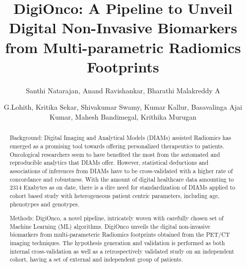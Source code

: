 \documentclass[final,1p,times,twocolumn]{elsarticle}
\begin{document}
\begin{frontmatter}



\title{DigiOnco: A Pipeline to Unveil Digital Non-Invasive Biomarkers from Multi-parametric Radiomics Footprints}


\author[label1]{Santhi Natarajan, Anand Ravishankar, Bharathi Malakreddy A}
\author[label2]{G.Lohith, Kritika Sekar, Shivakumar Swamy, Kumar Kallur, Basavalinga Ajai Kumar, Mahesh Bandimegal, Krithika Murugan}
\address[label1]{BMS Institute of Technology and Management, Visweswaraiah Technological Univesity, Bangalore, India}
\address[label2]{Health Care Global Hospitals, Bangalore, India}

\begin{abstract}
Background: Digital Imaging and Analytical Models (DIAMs) assisted Radiomics has emerged as a promising tool towards offering personalized therapeutics to patients. Oncological researchers seem to have benefited the most from the automated and reproducible analytics that DIAMs offer. However, statistical deductions and associations of inferences from DIAMs have to be cross-validated with a higher rate of concordance and robustness. With the amount of digital healthcare data amounting to 2314 Exabytes as on date, there is a dire need for standardization of DIAMs applied to cohort based study with heterogeneous patient centric parameters, including age, phenotypes and genotypes. 

Methods: DigiOnco, a novel pipeline, intricately woven with carefully chosen set of Machine Learning (ML) algorithms. DigiOnco unveils the digital non-invasive biomarkers from multi-parameteric Radiomics footprints obtained from the PET/CT imaging techniques. The hypothesis generation and validation is performed as both internal cross-validation as well as a retrospectively validated study on an independent cohort, having a set of external and independent group of patients.


\end{abstract}
\end{frontmatter}
\end{document}
